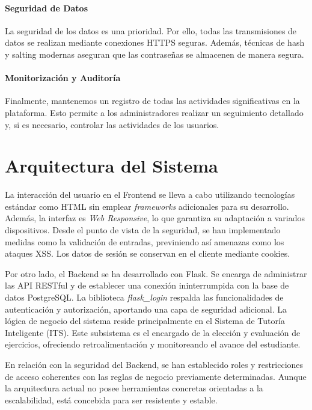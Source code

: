 \paragraph{Seguridad de Datos}
La seguridad de los datos es una prioridad. Por ello, todas las transmisiones de datos se realizan mediante conexiones HTTPS seguras. Además, técnicas de hash y salting modernas aseguran que las contraseñas se almacenen de manera segura.

\paragraph{Monitorización y Auditoría}
Finalmente, mantenemos un registro de todas las actividades significativas en la plataforma. Esto permite a los administradores realizar un seguimiento detallado y, si es necesario, controlar las actividades de los usuarios.

\section{Arquitectura del Sistema}

La interacción del usuario en el Frontend se lleva a cabo utilizando tecnologías estándar como HTML sin emplear \textit{frameworks} adicionales para su desarrollo. Además, la interfaz es \textit{Web Responsive}, lo que garantiza su adaptación a variados dispositivos. Desde el punto de vista de la seguridad, se han implementado medidas como la validación de entradas, previniendo así amenazas como los ataques XSS. Los datos de sesión se conservan en el cliente mediante cookies.

Por otro lado, el Backend se ha desarrollado con Flask. Se encarga de administrar las API RESTful y de establecer una conexión ininterrumpida con la base de datos PostgreSQL. La biblioteca \textit{flask\_login} respalda las funcionalidades de autenticación y autorización, aportando una capa de seguridad adicional. La lógica de negocio del sistema reside principalmente en el Sistema de Tutoría Inteligente (ITS). Este subsistema es el encargado de la elección y evaluación de ejercicios, ofreciendo retroalimentación y monitoreando el avance del estudiante.

En relación con la seguridad del Backend, se han establecido roles y restricciones de acceso coherentes con las reglas de negocio previamente determinadas. Aunque la arquitectura actual no posee herramientas concretas orientadas a la escalabilidad, está concebida para ser resistente y estable.


